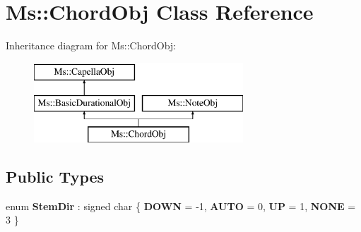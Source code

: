 \hypertarget{class_ms_1_1_chord_obj}{}\section{Ms\+:\+:Chord\+Obj Class Reference}
\label{class_ms_1_1_chord_obj}
Inheritance diagram for Ms\+:\+:Chord\+Obj\+:\begin{figure}[H]
\begin{center}
\leavevmode
\includegraphics[height=3.000000cm]{class_ms_1_1_chord_obj}
\end{center}
\end{figure}
\subsection*{Public Types}
\begin{DoxyCompactItemize}
\item 
\mbox{\label{class_ms_1_1_chord_obj_ac9c1f80aeab9f62886a420fd12b0abd5}} 
enum {\bfseries Stem\+Dir} \+: signed char \{ {\bfseries D\+O\+WN} = -\/1, 
{\bfseries A\+U\+TO} = 0, 
{\bfseries UP} = 1, 
{\bfseries N\+O\+NE} = 3
 \}
\end{DoxyCompactItemize}
